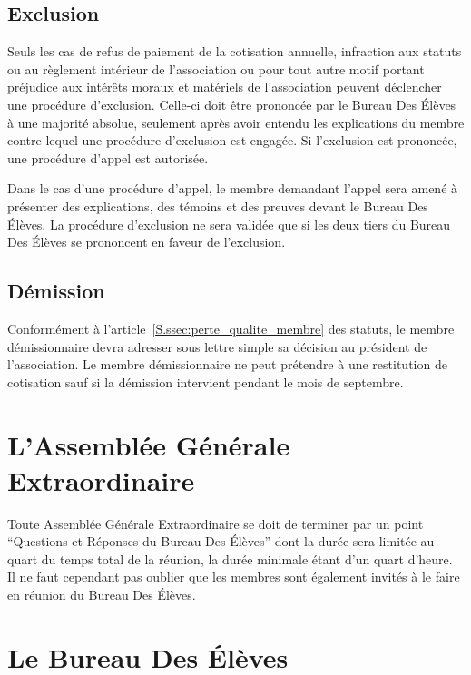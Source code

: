 \documentclass{article} %
\begin{document}
		\subsection{Exclusion}
			
			Seuls les cas de refus de paiement de la cotisation annuelle,
			infraction aux statuts ou au règlement intérieur de l'association ou
			pour tout autre motif portant préjudice aux intérêts moraux et
			matériels de l’association peuvent déclencher une procédure
			d’exclusion. Celle-ci doit être prononcée par le Bureau Des Élèves à
			une majorité absolue, seulement après avoir entendu les explications
			du membre contre lequel une procédure d’exclusion est engagée. Si
			l’exclusion est prononcée, une procédure d’appel est autorisée.

			Dans le cas d’une procédure d’appel, le membre demandant l’appel
			sera amené à présenter des explications, des témoins et des preuves
			devant le Bureau Des Élèves. La procédure d’exclusion ne sera
			validée que si les deux tiers du Bureau Des Élèves se prononcent en
			faveur de l’exclusion.

		\subsection{Démission}

			Conformément à l'article~\ref{S.ssec:perte_qualite_membre} des
			statuts, le membre démissionnaire devra adresser sous lettre simple
			sa décision au président de l’association. Le membre démissionnaire
			ne peut prétendre à une restitution de cotisation sauf si la
			démission intervient pendant le mois de septembre.

	\section{L'Assemblée Générale Extraordinaire}

		Toute Assemblée Générale Extraordinaire se doit de terminer par un point
		“Questions et Réponses du Bureau Des Élèves” dont la durée sera limitée
		au quart du temps total de la réunion, la durée minimale étant d’un
		quart d’heure. Il ne faut cependant pas oublier que les membres sont
		également invités à le faire en réunion du Bureau Des Élèves.

	\section{Le Bureau Des Élèves}
\end{document}
